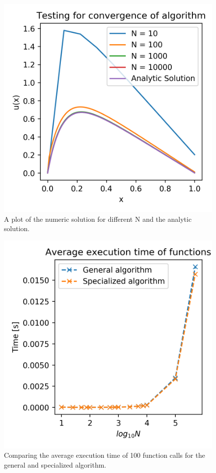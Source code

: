 \documentclass[10pt,showpacs,preprintnumbers,footinbib,amsmath,amssymb,aps,prl,twocolumn,groupedaddress,superscriptaddress,showkeys]{revtex4-1}
\begin{document}
  \begin{figure}[hbtp]
    \center
    \includegraphics[scale=.7]{figs/ex1c_compare.png}
    \caption{A plot of the numeric solution for different N and the analytic solution.}
  \end{figure}

  \begin{figure}[hbtp]
    \center
    \includegraphics[scale=.7]{figs/ex1d_time.png}
    \caption{Comparing the average execution time of 100 function calls for the general and specialized algorithm.}
  \end{figure}
\end{document}
